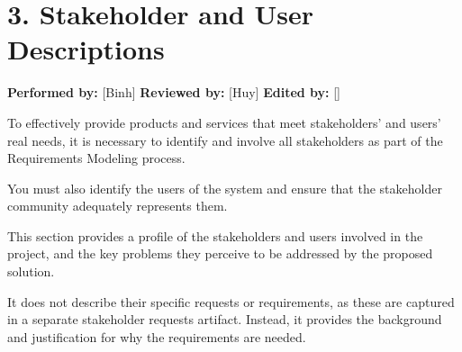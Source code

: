 \documentclass[12pt]{article}
\begin{document}
\section*{3. Stakeholder and User Descriptions}
\par\medskip
\textbf{\textbf{Performed by:}} [Binh] \textbar{} \textbf{\textbf{Reviewed by:}} [Huy] \textbar{} \textbf{\textbf{Edited by:}} []
\par\medskip
To effectively provide products and services that meet stakeholders' and users' real needs, it is necessary to identify and involve all stakeholders as part of the Requirements Modeling process.
\par\medskip
You must also identify the users of the system and ensure that the stakeholder community adequately represents them.
\par\medskip
This section provides a profile of the stakeholders and users involved in the project, and the key problems they perceive to be addressed by the proposed solution.
\par\medskip
It does not describe their specific requests or requirements, as these are captured in a separate stakeholder requests artifact. Instead, it provides the background and justification for why the requirements are needed.
\par\medskip
\hypertarget{sec:31-stakeholder-summary}{}
\end{document}
